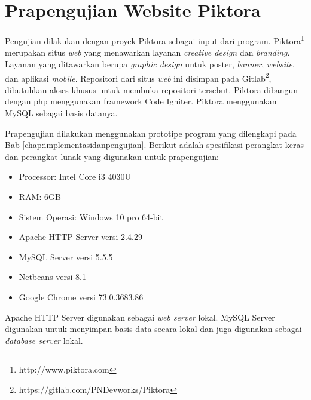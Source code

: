 \section{Prapengujian Website Piktora}
\label{sec:prapengujian}
Pengujian dilakukan dengan proyek Piktora sebagai input dari program. Piktora\footnote{http://www.piktora.com} merupakan situs \textit{web} yang menawarkan layanan  \textit{creative design} dan \textit{branding}. Layanan yang ditawarkan berupa \textit{graphic design} untuk poster, \textit{banner}, \textit{website}, dan aplikasi \textit{mobile}. Repositori dari situs \textit{web} ini disimpan pada Gitlab\footnote{https://gitlab.com/PNDevworks/Piktora}, dibutuhkan akses khusus untuk membuka repositori tersebut. Piktora dibangun dengan php  menggunakan framework Code Igniter. Piktora menggunakan MySQL sebagai basis datanya. 

Prapengujian dilakukan menggunakan prototipe program yang dilengkapi pada Bab \ref{chap:implementasidanpengujian}. Berikut adalah spesifikasi perangkat keras dan perangkat lunak yang digunakan untuk prapengujian:
\begin{itemize}
\item Processor: Intel Core i3 4030U
\item RAM: 6GB
\item Sistem Operasi: Windows 10 pro 64-bit
\item Apache HTTP Server versi 2.4.29
\item MySQL Server versi 5.5.5
\item Netbeans versi 8.1
\item Google Chrome versi 73.0.3683.86
\end{itemize}
Apache HTTP Server digunakan sebagai \textit{web server} lokal. MySQL Server digunakan untuk menyimpan basis data secara lokal dan juga digunakan sebagai \textit{database server} lokal. 


